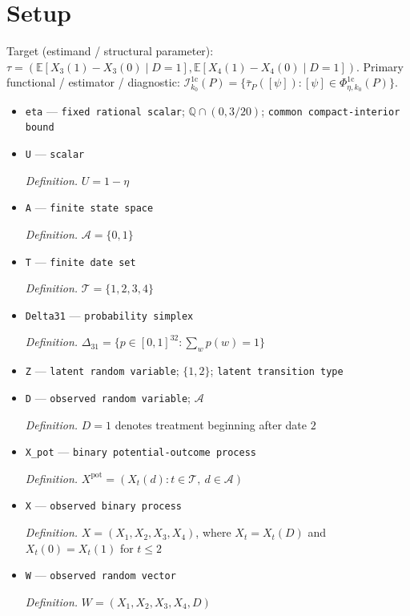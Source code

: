 \documentclass{article}
\begin{document}
\section{Setup}

Target (estimand / structural parameter): \(\tau=(\mathbb E[X_3(1)-X_3(0)\mid D=1],\mathbb E[X_4(1)-X_4(0)\mid D=1])\).
Primary functional / estimator / diagnostic: \(\mathcal I_{k_0}^{1\mathrm c}(P)=\{\bar\tau_P([\psi]):[\psi]\in\Phi_{\eta,k_0}^{1\mathrm c}(P)\}\).
\begin{itemize}
  \item \texttt{eta} --- \texttt{fixed rational scalar}; \(\mathbb Q\cap(0,3/20)\); \texttt{common compact-\allowbreak{}interior bound}
  \item \texttt{U} --- \texttt{scalar}
  \par\smallskip\noindent\emph{Definition.} \(U=1-\eta\)
  \item \texttt{A} --- \texttt{finite state space}
  \par\smallskip\noindent\emph{Definition.} \(\mathcal A=\{0,1\}\)
  \item \texttt{T} --- \texttt{finite date set}
  \par\smallskip\noindent\emph{Definition.} \(\mathcal T=\{1,2,3,4\}\)
  \item \texttt{Delta31} --- \texttt{probability simplex}
  \par\smallskip\noindent\emph{Definition.} \(\Delta_{31}=\{p\in[0,1]^{32}:\sum_w p(w)=1\}\)
  \item \texttt{Z} --- \texttt{latent random variable}; \(\{1,2\}\); \texttt{latent transition type}
  \item \texttt{D} --- \texttt{observed random variable}; \(\mathcal A\)
  \par\smallskip\noindent\emph{Definition.} \(D=1\) denotes treatment beginning after date \(2\)
  \item \texttt{X\_\allowbreak{}pot} --- \texttt{binary potential-\allowbreak{}outcome process}
  \par\smallskip\noindent\emph{Definition.} \(X^{\mathrm{pot}}=(X_t(d):t\in\mathcal T,\ d\in\mathcal A)\)
  \item \texttt{X} --- \texttt{observed binary process}
  \par\smallskip\noindent\emph{Definition.} \(X=(X_1,X_2,X_3,X_4)\), where \(X_t=X_t(D)\) and \(X_t(0)=X_t(1)\) for \(t\le2\)
  \item \texttt{W} --- \texttt{observed random vector}
  \par\smallskip\noindent\emph{Definition.} \(W=(X_1,X_2,X_3,X_4,D)\)

\end{itemize}
\end{document}
